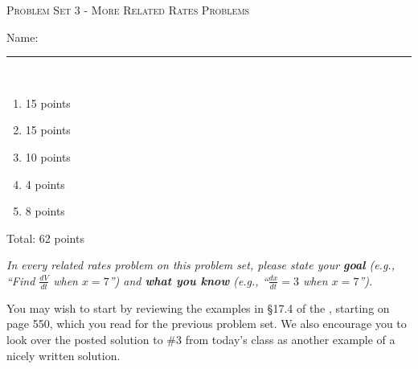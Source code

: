 \documentclass{article}
\begin{document}
\begin{center}
  \large\textsc{Problem Set 3 - More Related Rates Problems}
  
    \pspace{12pt}
  \begin{problemonly}\large Name: \rule{5cm}{0.15mm}\\ \end{problemonly}
\end{center}

\begin{grading}
\begin{enumerate}
    \item 15 points
    \item 15 points
    \item 10 points
    \item 4 points
    \item 8 points
\end{enumerate}
Total: 62 points
\end{grading}

\begin{problemonly}
  \emph{In every related rates problem on this problem set, please state
    your \textbf{goal} (e.g., ``Find $\frac{dV}{dt}$ when $x=7$'') and \textbf{what
      you know} (e.g., ``$\frac{dx}{dt} = 3$ when $x=7$'').}

  You may wish to start by reviewing the examples in \S 17.4 of the
  {\textbook}, starting on page 550, which you read for the previous
  problem set.  We also encourage you to look over the posted solution to
  {{\#3}} from today's class as another example
  of a nicely written solution.
\end{problemonly}
\end{document}
